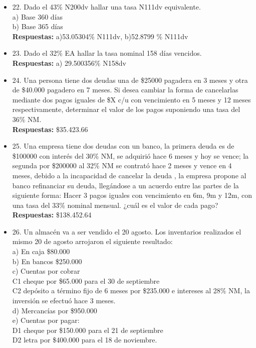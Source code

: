 \begin{itemize}
	\item 22. Dado el 43\% N200dv hallar una tasa N111dv equivalente.\\
	
	a) Base 360 días\\
	b) Base 365 días\\
	
	\textbf{Respuestas:} a)53.05304\% N111dv, b)52.8799 \% N111dv
	\medskip
	
	\item 23. Dado el 32\% EA hallar la tasa nominal 158 días vencidos. \\
	\textbf{Respuestas:} a) 29.500356\% N158dv
	\medskip
	
	\item 24. Una persona tiene dos deudas una de \$25000 pagadera en 3 meses y otra de \$40.000 pagadero en 7 meses. Si desea cambiar la forma de cancelarlas mediante dos pagos iguales de \$X c/u con vencimiento en 5 meses y 12 meses respectivamente, determinar el valor de los pagos suponiendo una tasa del 36\% NM.\\
	\textbf{Respuestas:} \$35.423.66
	\medskip
	
	\item 25. Una empresa tiene dos deudas con un banco, la primera deuda es de \$100000 con interés del 30\% NM, se adquirió hace 6 meses y hoy se vence; la segunda por \$200000 al 32\% NM se contrató hace 2 meses y vence en 4 meses, debido a la incapacidad de cancelar la deuda , la empresa propone al banco refinanciar su deuda, llegándose a un acuerdo entre las partes de la siguiente forma: Hacer 3 pagos iguales con vencimiento en 6m, 9m y 12m, con una tasa del 33\% nominal mensual. ¿cuál es el valor de cada pago?\\
	\textbf{Respuestas:} \$138.452.64
	\medskip
	
	\item 26. Un almacén va a ser vendido el 20 agosto. Los inventarios realizados el mismo 20 de agosto arrojaron el siguiente resultado:\\
	
	a)	En caja \$80.000\\
	b)	En bancos \$250.000\\
	c)	Cuentas por cobrar \\
	C1 cheque por \$65.000 para el 30 de septiembre\\
	C2 depósito a término fijo de 6 meses por \$235.000 e intereses al 28\% NM, la inversión se efectuó hace 3 meses.\\
	d)	Mercancías por \$950.000\\
	e)	Cuentas por pagar:\\
	D1 cheque por \$150.000 para el 21 de septiembre\\
	D2 letra por \$400.000 para el 18 de noviembre.\\
	

\end{itemize}
